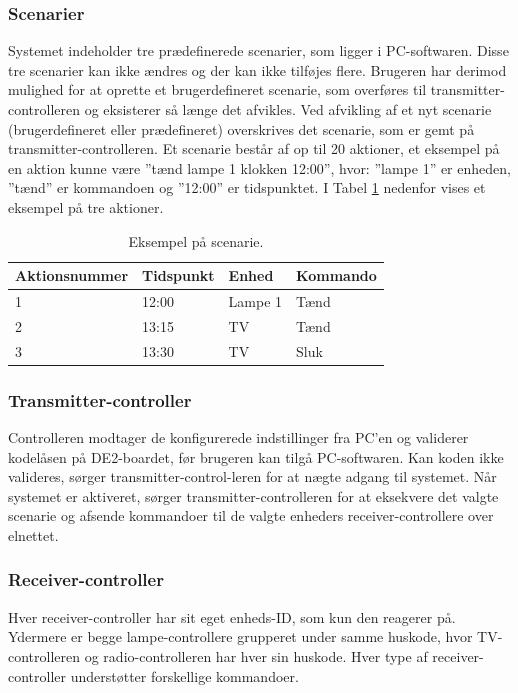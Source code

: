 \subsubsection{Scenarier}
Systemet indeholder tre prædefinerede scenarier, som ligger i PC-softwaren. Disse tre scenarier kan ikke ændres og der kan ikke tilføjes flere. Brugeren har derimod mulighed for at oprette et brugerdefineret scenarie, som overføres til transmitter-controlleren og eksisterer så længe det afvikles. Ved afvikling af et nyt scenarie (brugerdefineret eller prædefineret) overskrives det scenarie, som er gemt på transmitter-controlleren. Et scenarie består af op til 20 aktioner, et eksempel på en aktion kunne være ''tænd lampe 1 klokken 12:00'', hvor: ''lampe 1'' er enheden, ''tænd'' er kommandoen og ''12:00'' er tidspunktet. I Tabel \ref{tbl:kommando} nedenfor vises et eksempel på tre aktioner. \hfill

\begin{table}[h]
\centering
\begin{tabularx}{\textwidth - 5cm}{|l|l|X|X|} \hline
Aktionsnummer & Tidspunkt & Enhed & Kommando \\ \hline
1 & 12:00 & Lampe 1 & Tænd \\ \hline
2 & 13:15 & TV & Tænd \\ \hline
3 & 13:30 & TV & Sluk \\ \hline
\end{tabularx}
\label{tbl:kommando}
\caption{Eksempel på scenarie.}
\end{table} \hfill

\subsubsection{Transmitter-controller}
Controlleren modtager de konfigurerede indstillinger fra PC'en og validerer kodelåsen på DE2-boardet, før brugeren kan tilgå PC-softwaren.
Kan koden ikke valideres, sørger transmitter-control-leren for at nægte adgang til systemet.
Når systemet er aktiveret, sørger transmitter-controlleren for at eksekvere det valgte scenarie og afsende kommandoer til de valgte enheders receiver-controllere over elnettet.

\subsubsection{Receiver-controller}
Hver receiver-controller har sit eget enheds-ID, som kun den reagerer på. Ydermere er begge lampe-controllere grupperet under samme huskode, hvor TV-controlleren og radio-controlleren har hver sin huskode. Hver type af receiver-controller understøtter forskellige kommandoer.

